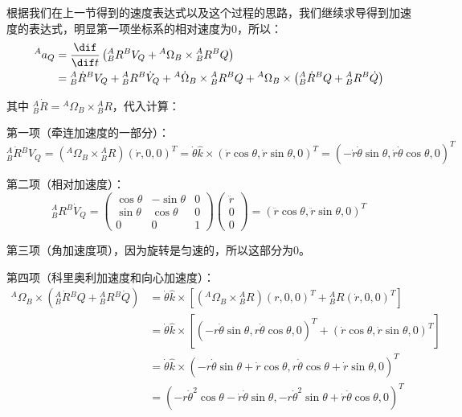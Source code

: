 根据我们在上一节得到的速度表达式以及这个过程的思路，我们继续求导得到加速度的表达式，明显第一项坐标系的相对速度为0，所以：
\[\begin{aligned}
    {}^A a_Q &= \dfrac{\dif}{\dif t}\left({}^A_B R {}^B V_Q + {}^A\Omega_B\times {}^A_B R {}^B Q\right) \\
    &= {}^A_B \dot{R} {}^B V_Q + {}^A_B R {}^B \dot{V}_Q + {}^A\dot{\Omega}_B\times {}^A_B R {}^B Q + {}^A\Omega_B\times \left({}^A_B \dot{R} {}^B Q + {}^A_B R {}^B \dot{Q}\right)
\end{aligned}\]

其中 \( {}^A_B \dot{R} = {}^A\Omega_B\times {}^A_B R \)，代入计算：

第一项（牵连加速度的一部分）：
\[{}^A_B \dot{R} {}^B V_Q = ({}^A\Omega_B\times {}^A_B R)(\dot{r},0,0)^T = \dot{\theta}\hat{k}\times(\dot{r}\cos\theta,\dot{r}\sin\theta,0)^T = (-\dot{r}\dot{\theta}\sin\theta,\dot{r}\dot{\theta}\cos\theta,0)^T\]

第二项（相对加速度）：
\[{}^A_B R {}^B \dot{V}_Q = \left(\begin{matrix}
    \cos\theta & -\sin\theta & 0\\
    \sin\theta & \cos\theta & 0\\
    0 & 0 & 1
\end{matrix}\right)\left(\begin{matrix}
    \ddot{r}\\ 0\\ 0
\end{matrix}\right) = (\ddot{r}\cos\theta,\ddot{r}\sin\theta,0)^T\]

第三项（角加速度项），因为旋转是匀速的，所以这部分为0。

第四项（科里奥利加速度和向心加速度）：
\[\begin{aligned}
    {}^A\Omega_B\times \left({}^A_B \dot{R} {}^B Q + {}^A_B R {}^B \dot{Q}\right) &= \dot{\theta}\hat{k}\times\left[({}^A\Omega_B\times {}^A_B R)(r,0,0)^T + {}^A_B R(\dot{r},0,0)^T\right] \\
    &= \dot{\theta}\hat{k}\times\left[(-r\dot{\theta}\sin\theta,r\dot{\theta}\cos\theta,0)^T + (\dot{r}\cos\theta,\dot{r}\sin\theta,0)^T\right] \\
    &= \dot{\theta}\hat{k}\times(-r\dot{\theta}\sin\theta+\dot{r}\cos\theta,r\dot{\theta}\cos\theta+\dot{r}\sin\theta,0)^T \\
    &= (-r\dot{\theta}^2\cos\theta-\dot{r}\dot{\theta}\sin\theta,-r\dot{\theta}^2\sin\theta+\dot{r}\dot{\theta}\cos\theta,0)^T
\end{aligned}\]

